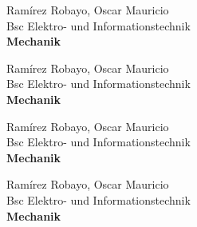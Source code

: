 \documentclass{book}
\begin{document}
\thispagestyle{empty}
\begin{flushright}Ramírez Robayo, Oscar Mauricio\\Bsc Elektro- und Informationstechnik\\\textbf{Mechanik}\end{flushright}\noindent\makebox[\linewidth]{\rule{\paperwidth}{0.4pt}}
\clearpage
\thispagestyle{empty}
\begin{flushright}Ramírez Robayo, Oscar Mauricio\\Bsc Elektro- und Informationstechnik\\\textbf{Mechanik}\end{flushright}\noindent\makebox[\linewidth]{\rule{\paperwidth}{0.4pt}}
\clearpage
\thispagestyle{empty}
\begin{flushright}Ramírez Robayo, Oscar Mauricio\\Bsc Elektro- und Informationstechnik\\\textbf{Mechanik}\end{flushright}\noindent\makebox[\linewidth]{\rule{\paperwidth}{0.4pt}}\clearpage
\thispagestyle{empty}
\begin{flushright}Ramírez Robayo, Oscar Mauricio\\Bsc Elektro- und Informationstechnik\\\textbf{Mechanik}\end{flushright}\noindent\makebox[\linewidth]{\rule{\paperwidth}{0.4pt}}
\end{document}
